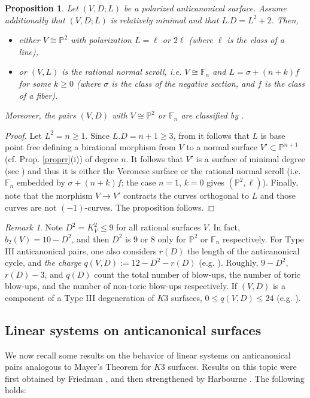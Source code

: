 \documentclass{amsart}
\numberwithin{equation}{section}
\theoremstyle{plain}
\newtheorem{proposition}[equation]{Proposition}
\theoremstyle{remark}
\newtheorem{remark}[equation]{Remark}
\theoremstyle{definition}
\newcommand{\bP}{\mathbb{P}}
\newcommand{\bF}{\mathbb{F}}
\begin{document}
\begin{proposition}\label{propclassify}
Let $(V,D;L)$ be a polarized anticanonical surface. Assume additionally that $(V,D;L)$ is relatively minimal and that $L.D= L^2+2$. Then,
\begin{itemize}
\item[i)] either   $V\cong \bP^2$ with polarization $L=\ell$ or $2\ell$ (where $\ell$ is the class of a line),
\item[ii)] or $(V,L)$ is the rational normal scroll, i.e. $V\cong \bF_n$ and $L=\sigma+(n+k)f$ for some $k\ge 0$ (where $\sigma$ is the class of the negative section, and $f$ is the class of a fiber). 
\end{itemize}
Moreover, the pairs $(V,D)$ with $V\cong \bP^2$ or $\bF_n$ are classified by \cite[Lem. 3.2]{fmiranda}.
\end{proposition}
\begin{proof}
Let $L^2=n\ge 1$. Since $L.D=n+1\ge 3$, from \cite[Prop. 3.2]{har2} it follows that $L$ is base point free defining a birational morphism from $V$ to a normal surface $V'\subset \bP^{n+1}$ (cf. Prop. \ref{proprr}(i)) of degree $n$. It follows that $V'$ is a surface of minimal degree (see \cite[p. 525]{gh}) and thus it is either the Veronese surface or the rational normal scroll (i.e. $\bF_n$ embedded by $\sigma+(n+k)f$; the case $n=1$, $k=0$ gives $(\bP^2,\ell)$). Finally, note that the morphism $V\to V'$ contracts the curves orthogonal to $L$ and those curves are not $(-1)$-curves. The proposition follows. 
\end{proof}

\begin{remark}
Note $D^2=K_V^2\le 9$ for all rational surfaces $V$. In fact, $b_2(V)=10-D^2$, and then $D^2$ is $9$ or $8$ only for $\bP^2$ or $\bF_n$ respectively. 
For Type III anticanonical pairs, one also considers $r(D)$ the length of the anticanonical cycle, and {\it the charge} $q(V,D):=12-D^2-r(D)$ (e.g. \cite[\S3]{fmiranda}).
Roughly, $9-D^2$, $r(D)-3$, and $q(D)$ count the total number of blow-ups, the number of toric blow-ups, and the number of non-toric blow-ups respectively. If $(V,D)$ is a component of a Type III degeneration of $K3$ surfaces,  $0\le q(V,D)\le 24$ (e.g. \cite[\S3]{fmiranda}).
\end{remark}





\subsection{Linear systems on anticanonical surfaces} We now recall some results on the behavior of linear systems on anticanonical pairs analogous to Mayer's Theorem for $K3$ surfaces.  Results on this topic were first obtained by Friedman \cite{friedmanlin}, and then strengthened by Harbourne \cite{har1,har2}. The following  holds:
\end{document}
